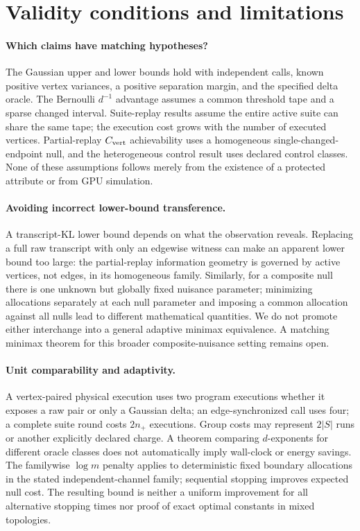 \section{Validity conditions and limitations}
\label{sec:gate}
\paragraph{Which claims have matching hypotheses?}
The Gaussian upper and lower bounds hold with independent calls, known positive vertex variances, a positive separation margin, and the specified delta oracle. The Bernoulli $d^{-1}$ advantage assumes a common threshold tape and a sparse changed interval. Suite-replay results assume the entire active suite can share the same tape; the execution cost grows with the number of executed vertices. Partial-replay $C_{\rm vert}$ achievability uses a homogeneous single-changed-endpoint null, and the heterogeneous control result uses declared control classes. None of these assumptions follows merely from the existence of a protected attribute or from GPU simulation.

\paragraph{Avoiding incorrect lower-bound transference.}
A transcript-KL lower bound depends on what the observation reveals. Replacing a full raw transcript with only an edgewise witness can make an apparent lower bound too large: the partial-replay information geometry is governed by active vertices, not edges, in its homogeneous family. Similarly, for a composite null there is one unknown but globally fixed nuisance parameter; minimizing allocations separately at each null parameter and imposing a common allocation against all nulls lead to different mathematical quantities. We do not promote either interchange into a general adaptive minimax equivalence. A matching minimax theorem for this broader composite-nuisance setting remains open.

\paragraph{Unit comparability and adaptivity.}
A vertex-paired physical execution uses two program executions whether it exposes a raw pair or only a Gaussian delta; an edge-synchronized call uses four; a complete suite round costs $2n_+$ executions. Group costs may represent $2|S|$ runs or another explicitly declared charge. A theorem comparing $d$-exponents for different oracle classes does not automatically imply wall-clock or energy savings. The familywise $\log m$ penalty applies to deterministic fixed boundary allocations in the stated independent-channel family; sequential stopping improves expected null cost. The resulting bound is neither a uniform improvement for all alternative stopping times nor proof of exact optimal constants in mixed topologies.

